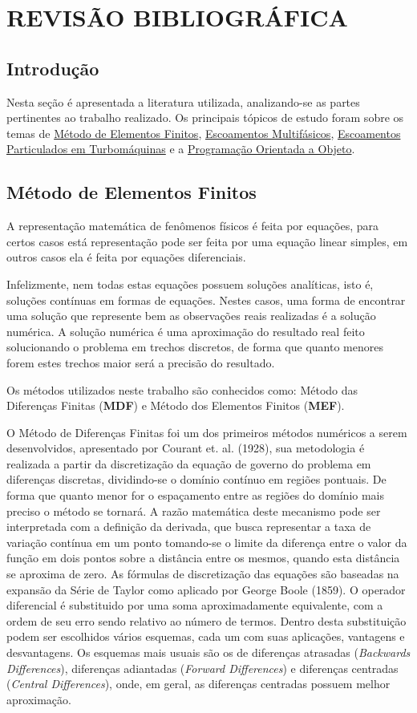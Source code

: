 \chapter{REVISÃO BIBLIOGRÁFICA}
\label{rev_bib}
\section{\textbf{Introdução}}
Nesta seção é apresentada a literatura utilizada, analizando-se as partes pertinentes ao trabalho realizado. Os principais tópicos de estudo foram sobre os temas de \hyperref[sec_rev_MEF]{Método de Elementos Finitos}, \hyperref[sec_rev_MF]{Escoamentos Multifásicos}, \hyperref[sec_rev_EP]{Escoamentos Particulados em Turbomáquinas} e a \hyperref[sec_rev_POO]{Programação Orientada a Objeto}.

\section{\textbf{Método de Elementos Finitos}}
\label{sec_rev_MEF}
A representação matemática de fenômenos físicos é feita por equações, para certos casos está representação pode ser feita por uma equação linear simples, em outros casos ela é feita por equações diferenciais.

Infelizmente, nem todas estas equações possuem soluções analíticas, isto é, soluções contínuas em formas de equações.
Nestes casos, uma forma de encontrar uma solução que represente bem as observações reais realizadas é a solução numérica.
A solução numérica é uma aproximação do resultado real feito solucionando o problema em trechos discretos, de forma que quanto menores forem estes trechos maior será a precisão do resultado.

Os métodos utilizados neste trabalho são conhecidos como: Método das Diferenças Finitas (\textbf{MDF}) e Método dos Elementos Finitos (\textbf{MEF}).

O Método de Diferenças Finitas foi um dos primeiros métodos numéricos a serem desenvolvidos, apresentado por Courant et. al. (1928)\cite{Courant-1928}, sua metodologia é realizada a partir da discretização da equação de governo do problema em diferenças discretas, dividindo-se o domínio contínuo em regiões pontuais.
De forma que quanto menor for o espaçamento entre as regiões do domínio mais preciso o método se tornará.
A razão matemática deste mecanismo pode ser interpretada com a definição da derivada, que busca representar a taxa de variação contínua em um ponto tomando-se o limite da diferença entre o valor da função em dois pontos sobre a distância entre os mesmos, quando esta distância se aproxima de zero.
As fórmulas de discretização das equações são baseadas na expansão da Série de Taylor como aplicado por George Boole (1859)\cite{Boole-1859}.
O operador diferencial é substituido por uma soma aproximadamente equivalente, com a ordem de seu erro sendo relativo ao número de termos.
Dentro desta substituição podem ser escolhidos vários esquemas, cada um com suas aplicações, vantagens e desvantagens.
Os esquemas mais usuais são os de diferenças atrasadas (\textit{Backwards Differences}), diferenças adiantadas (\textit{Forward Differences}) e diferenças centradas (\textit{Central Differences}), onde, em geral, as diferenças centradas possuem melhor aproximação.

